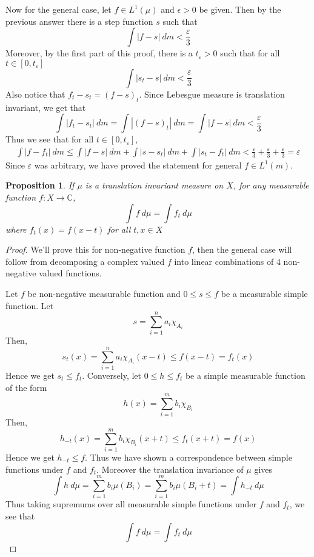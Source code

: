 \documentclass[12pt]{exam}
\theoremstyle{plain} %
\newtheorem{proposition}{Proposition}[section]
\theoremstyle{definition} %
\theoremstyle{remark} %
\begin{document}
\begin{questions}
\begin{solution}
    Now for the general case, let $f \in L^1(\mu)$ and $\epsilon > 0$
    be given. Then by the previous answer there is a step function
    $s$ such that  \[
      \int |f - s| \ d m <  \frac{\varepsilon}{3}
    \]
    Moreover, by the first part of this proof, there is a
    $t_\varepsilon > 0$ such that for all $t \in [0, t_\varepsilon]$ \[
      \int |s_t - s| \ d m < \frac{\varepsilon}{3}
    \]
    Also notice that $f_t - s_t = (f-s)_t$.
    Since Lebesgue measure is translation invariant, we get that \[
      \int |f_t - s_t| \ d m  = \int |(f-s)_t| \ d m = \int |f - s|
      \ d m < \frac{\varepsilon}{3}
    \]
    Thus we see that for all $t \in [0, t_\varepsilon]$,
    \begin{align*}
      \int |f - f_t| \ d m \le \int |f-s| \ d m + \int |s - s_t| \ d
      m + \int |s_t - f_t| \ d m < \frac{\varepsilon}{3} +
      \frac{\varepsilon}{3} + \frac{\varepsilon}{3} = \varepsilon
    \end{align*}
    Since $\varepsilon$ was arbitrary, we have proved the statement
    for general $f \in L^1(m)$.
  \end{solution}

  \begin{proposition}
    If $\mu$ is a translation invariant measure on $X$, for any measurable
    function $f: X \to \mathbb{C}$, \[
      \int f \ d \mu = \int f_t \ d \mu
    \]
    where $f_t(x) = f(x-t)$ for all $t, x \in X$
  \end{proposition}
  \begin{proof}
    We'll prove this for non-negative function $f$, then the general
    case will follow from decomposing a complex valued $f$ into
    linear combinations of 4 non-negative valued functions.

    Let $f$ be non-negative measurable function and $0 \le s \le f$ be a
    measurable simple function. Let \[
      s = \sum_{i = 1}^{n} a_i \chi_{A_i}
    \]
    Then, \[
      s_t(x) = \sum_{i = 1}^{n} a_i \chi_{A_i}(x-t) \le f(x-t) = f_t(x)
    \]
    Hence we get $s_t \le f_t$. Conversely, let $0 \le h \le f_t$ be a
    simple measurable function of the form
    \[
      h(x) = \sum_{i = 1}^{m} b_i \chi_{B_i}
    \]
    Then, \[
      h_{-t}(x) = \sum_{i = 1}^{m} b_i \chi_{B_i}(x+t) \le f_t(x+t) = f(x)
    \]
    Hence we get $h_{-t} \le f$. Thus we have shown a correspondence
    between simple functions under $f$ and $f_t$. Moreover the
    translation invariance of $\mu$ gives \[
      \int h \ d \mu = \sum_{i = 1}^{m} b_i \mu(B_i) = \sum_{i =
      1}^{m} b_i \mu(B_i + t) =  \int  h_{-t} \ d \mu
    \]
    Thus taking supremums over all measurable simple functions under
    $f$ and $f_t$, we see that \[
      \int f \ d \mu = \int f_{t} \ d \mu
    \]
  \end{proof}

\end{questions}
\printbibliography[heading=bibintoc]
\end{document}
